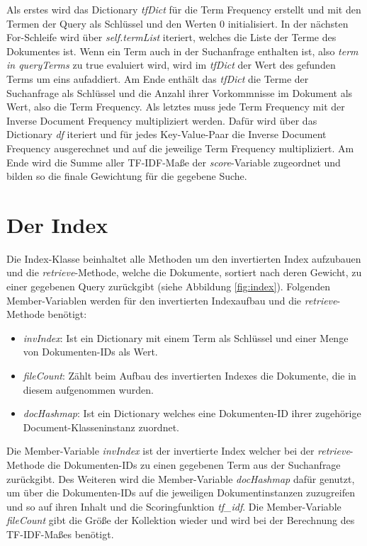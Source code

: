 Als erstes wird das Dictionary \textit{tfDict} für die Term Frequency erstellt und mit den Termen der Query als Schlüssel und den Werten 0 initialisiert. In der nächsten For-Schleife wird über \textit{self.termList} iteriert, welches die Liste der Terme des Dokumentes ist. Wenn ein Term auch in der Suchanfrage enthalten ist, also \textit{term in queryTerms} zu true evaluiert wird, wird im \textit{tfDict} der Wert des gefunden Terms um eins aufaddiert. Am Ende enthält das \textit{tfDict} die Terme der Suchanfrage als Schlüssel und die Anzahl ihrer Vorkommnisse im Dokument als Wert, also die Term Frequency. Als letztes muss jede Term Frequency mit der Inverse Document Frequency multipliziert werden. Dafür wird über das Dictionary \textit{df} iteriert und für jedes Key-Value-Paar die Inverse Document Frequency ausgerechnet und auf die jeweilige Term Frequency multipliziert. Am Ende wird die Summe aller TF-IDF-Maße der \textit{score}-Variable zugeordnet und bilden so die finale Gewichtung für die gegebene Suche.

\section{Der Index}\label{der-index}

Die Index-Klasse beinhaltet alle Methoden um den invertierten Index aufzubauen und die \textit{retrieve}-Methode, welche die Dokumente, sortiert nach deren Gewicht, zu einer gegebenen Query zurückgibt (siehe Abbildung \ref{fig:index}). Folgenden Member-Variablen werden für den invertierten Indexaufbau und die \textit{retrieve}-Methode benötigt:

\begin{itemize}
	\item \textit{invIndex}: Ist ein Dictionary mit einem Term als Schlüssel und einer Menge von Dokumenten-IDs als Wert.
	\item \textit{fileCount}: Zählt beim Aufbau des invertierten Indexes die Dokumente, die in diesem aufgenommen wurden.
	\item \textit{docHashmap}: Ist ein Dictionary welches eine Dokumenten-ID ihrer zugehörige Document-Klasseninstanz zuordnet.
\end{itemize}

Die Member-Variable \textit{invIndex} ist der invertierte Index welcher bei der \textit{retrieve}-Methode die Dokumenten-IDs zu einen gegebenen Term aus der Suchanfrage zurückgibt. Des Weiteren wird die Member-Variable \textit{docHashmap} dafür genutzt, um über die Dokumenten-IDs auf die jeweiligen Dokumentinstanzen zuzugreifen und so auf ihren Inhalt und die Scoringfunktion \textit{tf\_idf}. Die Member-Variable \textit{fileCount} gibt die Größe der Kollektion wieder und wird bei der Berechnung des TF-IDF-Maßes benötigt.

